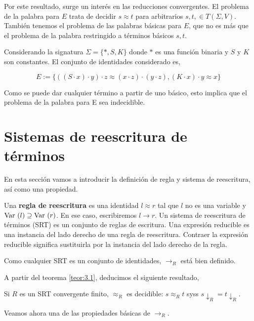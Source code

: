 Por este resultado, surge un interés en las reducciones convergentes.
El problema de la palabra para $E$ trata de decidir $s \approx t$ para
arbitrarios $s,t, \in T(\Sigma, V)$. También tenemos el problema de
las palabras básicas para $E$, que no es más que el problema de la
palabra restringido a términos básicos $s,t$.

\begin{ejem}
  Considerando la signatura $\Sigma = \{*, S, K\}$ donde $*$ es una
  función binaria y $S$ y $K$ son constantes. El conjunto de
  identidades considerado es,

  \[E := \{((S \cdot x) \cdot y) \cdot z \approx (x \cdot z) \cdot (y
    \cdot z),(K \cdot x) \cdot y \approx x \} \]

  Como se puede dar cualquier término a partir de uno básico, esto
  implica que el problema de la palabra para E sea indecidible.
\end{ejem}

\section{Sistemas de reescritura de términos}

En esta sección vamos a introducir la definición de regla y sistema de
reescritura, así como una propiedad.

\begin{defi}
  Una \textbf{regla de reescritura} es una identidad $l \approx r$ tal que $l$
  no es una variable y $\mbox{Var }(l) \supseteq \mbox{Var }(r)$. En ese caso,
  escribiremos $l \rightarrow r$. Un sistema de reescritura de
  términos (SRT) es un conjunto de reglas de escritura. Una expresión
  reducible es una instancia del lado derecho de una regla de
  reescritura. Contraer la expresión reducible significa sustituirla
  por la instancia del lado derecho de la regla.
\end{defi}

Como cualquier SRT es un conjunto de identidades, $\rightarrow_R$ está
bien definido.

A partir del teorema \ref{teor:3.1}, deducimos el siguiente resultado,

\begin{teor}
  Si $R$ es un SRT convergente finito, $\approx_R$ es decidible: $s
  \approx_R t$ syss $s \downarrow_R = t \downarrow_R$.
\end{teor}

Veamos ahora una de las propiedades básicas de $\rightarrow_R$.

